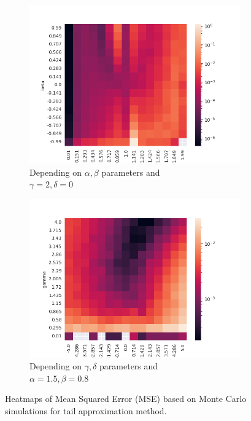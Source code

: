 \documentclass{article}
\begin{document}
		\subsubsection{}
		\begin{figure}[H]
			\begin{subfigure}{.5\textwidth}
				\centering
				\includegraphics[width=1\linewidth]{images/heatmap_cdf_MSE_alpha_beta.png}
				\caption{Depending on $\alpha, \beta$ parameters and \\$\gamma = 2, \delta = 0$}
			\end{subfigure}
			\begin{subfigure}[r]{.5\textwidth}
				\centering
				\includegraphics[width=1\linewidth]{images/heatmap_cdf_MSE_gamma_delta.png}
				\caption{Depending on $\gamma, \delta$ parameters and \\$\alpha = 1.5, \beta = 0.8$}
			\end{subfigure}
			\caption{Heatmaps of Mean Squared Error (MSE) based on Monte Carlo simulations for tail approximation method.}
		\end{figure}
\end{document}
